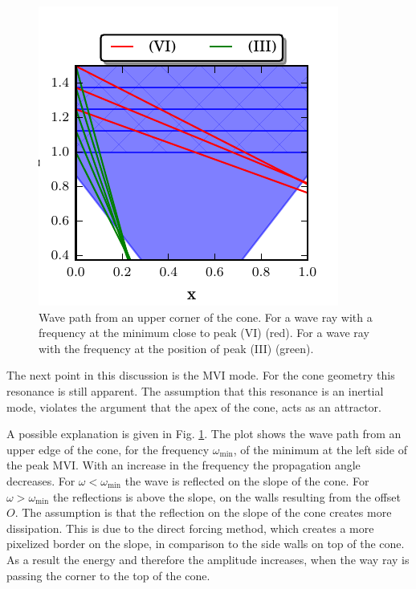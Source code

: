 \begin{figure}[!t]
  \begin{minipage}[c]{0.4\textwidth}
      \centering
      \includegraphics{gfx/cone/discussion/corners.pdf}
  \end{minipage}
  \hfill
  \begin{minipage}[c]{0.5\textwidth}
      \caption{\label{fig:conediscuss:corners}
        Wave path from an upper corner of the cone.
        For a wave ray with a frequency at the minimum close to peak (\RN{6}) (red).
        For a wave ray with the frequency at the position of peak (\RN{3}) (green).
      }
  \end{minipage}
\end{figure}


The next point in this discussion is the M\RN{6} mode.
For the cone geometry this resonance is still apparent.
The assumption that this resonance is an inertial mode,
violates the argument that the apex of the cone, acts as
an attractor.

A possible explanation is given in Fig. \ref{fig:conediscuss:corners}.
The plot shows the wave path from an upper edge of the cone, for the frequency $\omega_{\text{min}}$,
of the minimum at the left side of the peak M\RN{6}.
With an increase in the frequency the propagation angle decreases.
For $\omega<\omega_{\text{min}}$ the wave is reflected on the slope of the cone.
For $\omega>\omega_{\text{min}}$ the reflections is above the slope, on the walls resulting from the offset $O$.
The assumption is that the reflection on the slope of the cone creates more dissipation.
This is due to the direct forcing method, which creates a more pixelized border on the slope,
in comparison to the side walls on top of the cone.
As a result the energy and therefore the amplitude increases,
when the way ray is passing the corner to the top of the cone.

